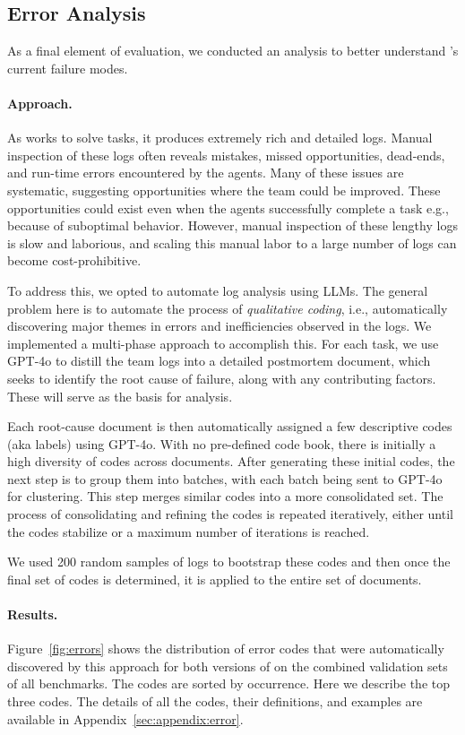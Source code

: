 \subsection{Error Analysis}

As a final element of evaluation, we conducted an analysis to better understand \team's current failure modes.

\paragraph{Approach.} As \team works to solve tasks, it produces extremely rich and detailed logs. Manual inspection of these logs often reveals mistakes, missed opportunities, dead-ends, and run-time errors encountered by the agents. Many of these issues are systematic, suggesting opportunities where the team could be improved. These opportunities could exist even when the agents successfully complete a task e.g., because of suboptimal behavior. However, manual inspection of these lengthy logs is slow and laborious, and scaling this manual labor to a large number of logs can become cost-prohibitive. 

To address this, we opted to automate log analysis using LLMs. The general problem here is to automate the process of {\em qualitative coding}, i.e., automatically discovering major themes in errors and inefficiencies observed in the logs. We implemented a multi-phase approach to accomplish this. For each task, we use GPT-4o to distill the team logs into a detailed postmortem document, which seeks to identify the root cause of failure, along with any contributing factors. These will serve as the basis for analysis. 

Each root-cause document is then automatically assigned a few descriptive codes (aka labels) using GPT-4o. With no pre-defined code book, there is initially a high diversity of codes across documents. After generating these initial codes, the next step is to group them into batches, with each batch being sent to  GPT-4o for clustering. This step merges similar codes into a more consolidated set. The process of consolidating and refining the codes is repeated iteratively, either until the codes stabilize or a maximum number of iterations is reached. 

We used 200 random samples of logs to bootstrap these codes and then once the final set of codes is determined, it is applied to the entire set of documents. 

\paragraph{Results.} Figure~\ref{fig:errors} shows the distribution of error codes that were automatically discovered by this approach for both versions of \team on the combined validation sets of all benchmarks. The codes are sorted by occurrence. Here we describe the top three codes. The details of all the codes, their definitions, and examples are available in Appendix~\ref{sec:appendix:error}. 

